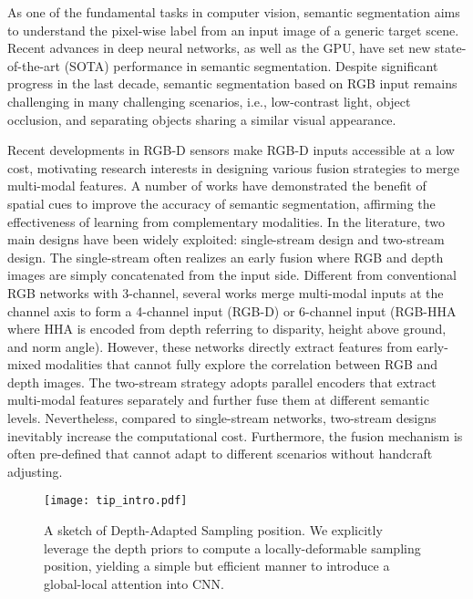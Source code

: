 \documentclass[lettersize,journal]{IEEEtran}
\begin{document}
As one of the fundamental tasks in computer vision, semantic segmentation aims to understand the pixel-wise label from an input image of a generic target scene. Recent advances in deep neural networks, as well as the GPU, have set new state-of-the-art (SOTA) performance in semantic segmentation. Despite significant progress in the last decade, semantic segmentation based on RGB input remains challenging in many challenging scenarios, i.e., low-contrast light, object occlusion, and separating objects sharing a similar visual appearance. 



Recent developments in RGB-D sensors make RGB-D inputs accessible at a low cost, motivating research interests in designing various fusion strategies to merge multi-modal features. A number of works have demonstrated the benefit of spatial cues to improve the accuracy of semantic segmentation, affirming the effectiveness of learning from complementary modalities. In the literature, two main designs have been widely exploited: single-stream design and two-stream design. The single-stream often realizes an early fusion where RGB and depth images are simply concatenated from the input side. Different from conventional RGB networks with 3-channel, several works merge multi-modal inputs at the channel axis to form a 4-channel input (RGB-D) or 6-channel input (RGB-HHA where HHA is encoded from depth referring to disparity, height above ground, and norm angle). However, these networks directly extract features from early-mixed modalities that cannot fully explore the correlation between RGB and depth images. The two-stream strategy adopts parallel encoders that extract multi-modal features separately and further fuse them at different semantic levels. Nevertheless, compared to single-stream networks, two-stream designs inevitably increase the computational cost. Furthermore, the fusion mechanism is often pre-defined that cannot adapt to different scenarios without handcraft adjusting. 

\begin{figure}[t]
\texttt{[image: tip\_intro.pdf]}
\caption{A sketch of Depth-Adapted Sampling position. We explicitly leverage the depth priors to compute a locally-deformable sampling position, yielding a simple but efficient manner to introduce a global-local attention into CNN.}
\label{fig:adapted}
\end{figure}
\end{document}
